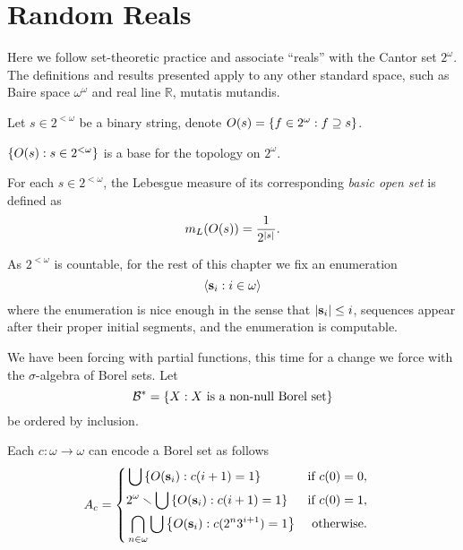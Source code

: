 \section{Random Reals}

\newcommand*{\B}{{\mathcal{B}}}

Here we follow set-theoretic practice and associate ``reals'' with the Cantor set \(2^\omega\).
The definitions and results presented apply to any other standard space,
such as Baire space \(\omega^\omega\) and real line \(\mathbb{R}\), mutatis mutandis.

\begin{definition}
    Let \(s \in 2^{<\omega}\) be a binary string, denote \(O(s) = {\left\{ f\in 2^\omega: f\supseteq s \right\}}\).
\end{definition}
\begin{proposition}
    \({\left\{ O(s): s\in 2^{<\omega} \right\}}\) is a base for the topology on \(2^\omega\).
\end{proposition}
\begin{definition}
    For each \(s\in 2^{<\omega}\), the Lebesgue measure of its corresponding \emph{basic open set} is defined as
    \[ m_L(O(s)) = \frac{1}{2^{\left\lvert s \right\rvert}}. \]
\end{definition}

As \(2^{<\omega}\) is countable, for the rest of this chapter
we fix an enumeration \[ \left\langle\mathbf{s}_i : i\in\omega\right\rangle \]
where the enumeration is nice enough in the sense that \(\left\lvert \mathbf{s}_i \right\rvert \leq i\),
sequences appear after their proper initial segments, and the enumeration is computable.

We have been forcing with partial functions,
this time for a change we force with the \(\sigma\)-algebra of Borel sets.
Let \[ \B^* = \set{ X: X \text{ is a non-null Borel set}} \]
be ordered by inclusion.

\begin{definition}
    Each \(c:\omega\to\omega\) can encode a Borel set as follows
    \[ A_c = \begin{cases} \begin{aligned}
        &\bigcup {\left\{ O(\mathbf{s}_i): c(i+1)=1 \right\}} &\text{if } c(0) = 0, \\
        &2^\omega\smallsetminus \bigcup{\left\{ O(\mathbf{s}_i): c(i+1)=1 \right\}} &\text{if } c(0) = 1, \\
        &\bigcap_{n\in\omega} \bigcup{\left\{ O(\mathbf{s}_i) : c(2^n3^{i+1})=1 \right\}} &\text{otherwise}.
    \end{aligned} \end{cases} \]
\end{definition}

